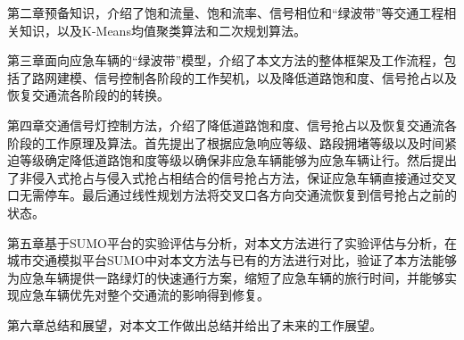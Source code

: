 第二章预备知识，介绍了饱和流量、饱和流率、信号相位和“绿波带”等交通工程相关知识，以及K-Means均值聚类算法和二次规划算法。

第三章面向应急车辆的“绿波带”模型，介绍了本文方法的整体框架及工作流程，包括了路网建模、信号控制各阶段的工作契机，以及降低道路饱和度、信号抢占以及恢复交通流各阶段的的转换。

第四章交通信号灯控制方法，介绍了降低道路饱和度、信号抢占以及恢复交通流各阶段的工作原理及算法。首先提出了根据应急响应等级、路段拥堵等级以及时间紧迫等级确定降低道路饱和度等级以确保非应急车辆能够为应急车辆让行。然后提出了非侵入式抢占与侵入式抢占相结合的信号抢占方法，保证应急车辆直接通过交叉口无需停车。最后通过线性规划方法将交叉口各方向交通流恢复到信号抢占之前的状态。

第五章基于SUMO平台的实验评估与分析，对本文方法进行了实验评估与分析，在城市交通模拟平台SUMO中对本文方法与已有的方法进行对比，验证了本方法能够为应急车辆提供一路绿灯的快速通行方案，缩短了应急车辆的旅行时间，并能够实现应急车辆优先对整个交通流的影响得到修复。


第六章总结和展望，对本文工作做出总结并给出了未来的工作展望。






